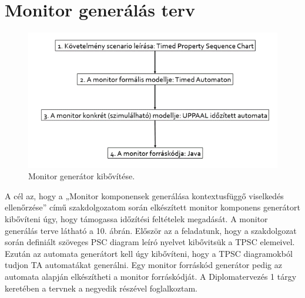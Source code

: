 \chapter{Monitor generálás terv}

\begin{figure}[!ht]
    \centering
    \includegraphics[width=150mm, keepaspectratio]{figures/10abra.png}
    \caption{Monitor generátor kibővítése.}
\end{figure}

A cél az, hogy a „Monitor komponensek generálása kontextusfüggő viselkedés ellenőrzése” című szakdolgozatom során elkészített monitor komponens generátort kibővíteni úgy, hogy támogassa időzítési feltételek megadását. A monitor generálás terve látható a 10. ábrán. Először az a feladatunk, hogy a szakdolgozat során definiált szöveges PSC diagram leíró nyelvet kibővitsük a TPSC elemeivel. Ezután az automata generátort kell úgy kibővíteni, hogy a TPSC diagramokból tudjon TA automatákat generálni. Egy monitor forráskód generátor pedig az automata alapján elkészítheti a monitor forráskódját. A Diplomatervezés 1 tárgy keretében a tervnek a negyedik részével foglalkoztam.